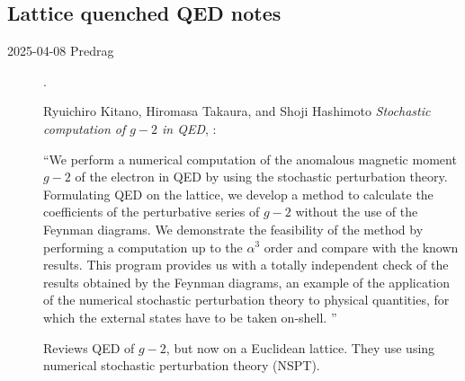 \subsection{Lattice quenched QED notes}
\label{sect:latticeQEDnotes}

\begin{description}

\item[2025-04-08 Predrag].
 \label{post:KiTaHa21}

Ryuichiro Kitano, Hiromasa Takaura, and 
{Shoji Hashimoto}
{\em Stochastic computation of  {$g-2$}  in QED},
:

``We perform a numerical computation of the anomalous magnetic moment {$g-2$} 
of the electron in QED by using the stochastic perturbation theory. 
Formulating QED on the lattice, we develop a method to calculate the 
coefficients of the perturbative series of {$g-2$} without the use of the 
Feynman diagrams. We demonstrate the feasibility of the method by 
performing a computation up to the $\alpha^3$  order and compare with the 
known results. This program provides us with a totally independent check 
of the results obtained by the Feynman diagrams, an example of the 
application of the numerical stochastic perturbation theory to physical 
quantities, for which the external states have to be taken on-shell. 
''

Reviews QED of {$g-2$}, but now on a Euclidean lattice.
They use using numerical stochastic perturbation theory (NSPT).


\end{description}
